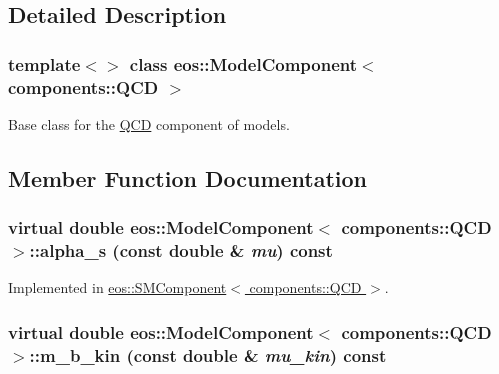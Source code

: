\subsection{Detailed Description}
\subsubsection*{template$<$$>$ class eos::ModelComponent$<$ components::QCD $>$}

Base class for the \hyperlink{classeos_1_1QCD}{QCD} component of models. 

\subsection{Member Function Documentation}
\hypertarget{classeos_1_1ModelComponent_3_01components_1_1QCD_01_4_abf241eb181bace5db7f3ac6f303d2eec}{
\subsubsection[{alpha\_\-s}]{\setlength{\rightskip}{0pt plus 5cm}virtual double eos::ModelComponent$<$ components::QCD $>$::alpha\_\-s (const double \& {\em mu}) const}}
\label{classeos_1_1ModelComponent_3_01components_1_1QCD_01_4_abf241eb181bace5db7f3ac6f303d2eec}


Implemented in \hyperlink{classeos_1_1SMComponent_3_01components_1_1QCD_01_4_a8f06baa780a1f99f22f2e45c9463df36}{eos::SMComponent$<$ components::QCD $>$}.\hypertarget{classeos_1_1ModelComponent_3_01components_1_1QCD_01_4_ad8449029b487c614a769e1b0d6012e4c}{
\subsubsection[{m\_\-b\_\-kin}]{\setlength{\rightskip}{0pt plus 5cm}virtual double eos::ModelComponent$<$ components::QCD $>$::m\_\-b\_\-kin (const double \& {\em mu\_\-kin}) const}}
\label{classeos_1_1ModelComponent_3_01components_1_1QCD_01_4_ad8449029b487c614a769e1b0d6012e4c}


